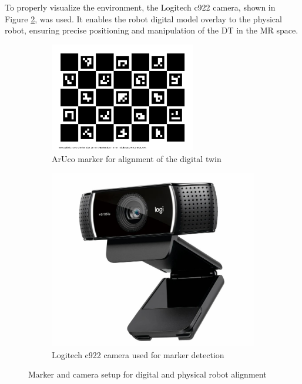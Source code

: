 To properly visualize the environment, the Logitech c922 camera, shown in Figure \ref{fig:camera-c922}, was used. It enables the robot digital model overlay to the physical robot, ensuring precise positioning and manipulation of the \ac{DT} in the \ac{MR} space.

\begin{figure}[h]
    \centering
    \begin{subfigure}[b]{0.45\textwidth}
    \centering
    \includegraphics[width=0.7\textwidth]{figs/calib_io_charuco_200x150_5x7_25_18_DICT_4X4.png}
    \caption{ArUco marker for alignment of the digital twin}
    \label{f:aruco_marker}
    \end{subfigure}
        \hfill
    \begin{subfigure}[b]{0.45\textwidth}
        \centering
        \includegraphics[width=0.7\linewidth]{figs/camera-c922.jpg}
        \caption{Logitech c922 camera used for marker detection}
        \label{fig:camera-c922}
    \end{subfigure}
    \caption{Marker and camera setup for digital and physical robot alignment}
\label{marker-camera}
\end{figure}

